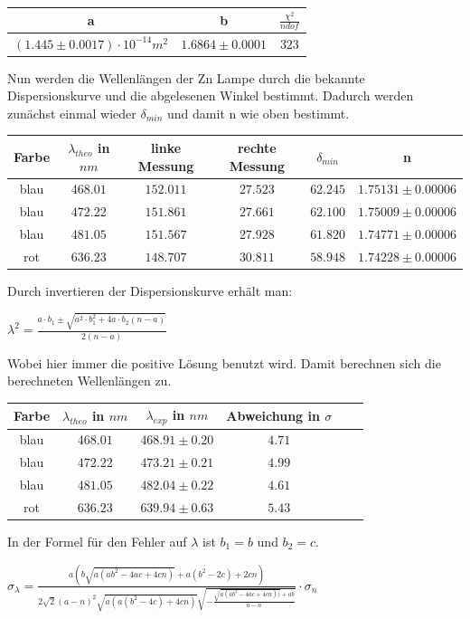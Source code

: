 \documentclass[a4paper, 11pt]{article}
\begin{document}
 \begin{center}
\begin{tabular}{|c|c|c|}
\hline a & b & $\frac{\chi^2}{ndof}$  \\
\hline  $(1.445 \pm 0.0017)\cdot 10^{-14}m^2 $&$1.6864 \pm 0.0001 $&$323 $\\
\hline
\end{tabular}
\end{center}

Nun werden die Wellenlängen der Zn Lampe durch die bekannte Dispersionskurve und die abgelesenen Winkel bestimmt.
Dadurch werden zunächst einmal wieder $\delta_{min}$ und damit n wie oben bestimmt.
\begin{center}
\begin{tabular}{|c|c|c|c|c|c|}
\hline Farbe & $\lambda_{theo}$ in $nm$ & linke Messung& rechte Messung& $\delta_{min}$ & n \\

\hline blau&$468.01$ &$152.011 $&$27.523 $&$62.245 $&$1.75131 \pm 0.00006$\\
\hline blau&$472.22$ &$151.861 $&$27.661 $&$62.100 $&$1.75009 \pm 0.00006$\\
\hline blau&$481.05$ &$151.567 $&$27.928 $&$61.820 $&$1.74771 \pm 0.00006$\\
\hline rot &$636.23$ &$148.707 $&$30.811 $&$58.948 $&$1.74228 \pm 0.00006$\\
\hline 
\end{tabular}
\end{center}



Durch invertieren der Dispersionskurve erhält man:
\begin{center}
$\lambda^2=\frac{a\cdot b_1 \pm \sqrt{a^2 \cdot b_1^2+4a\cdot b_2(n-a)}}{2(n-a)}$
\end{center}
Wobei hier immer die positive Lösung benutzt wird.
Damit berechnen sich die berechneten Wellenlängen zu.

\begin{center}
\begin{tabular}{|c|c|c|c|c|c|}
\hline Farbe & $\lambda_{theo}$ in $nm$ & $\lambda_{exp}$ in $nm$& Abweichung in $\sigma$\\

\hline blau&$468.01$ &$468.91 \pm 0.20 $&$4.71 $\\
\hline blau&$472.22$ &$473.21 \pm 0.21$&$4.99 $\\
\hline blau&$481.05$ &$482.04\pm 0.22 $&$4.61 $\\
\hline rot &$636.23$ &$639.94\pm 0.63 $&$5.43 $\\
\hline 
\end{tabular}
\end{center}
In der Formel für den Fehler auf $\lambda$ ist $b_1=b$ und $b_2=c$.
\begin{center}
$\sigma_{\lambda} = \frac{a (b \sqrt{a (a b^2 - 4 a c + 4 c n)} + a (b^2 - 2 c) + 2 c n)}{2 \sqrt{2} (a - n)^2 \sqrt{a (a (b^2 - 4 c) + 4 c n)} \sqrt{-\frac{\sqrt{ a (a b^2 - 4 a c + 4 c n))} + a b}{a - n}}}\cdot \sigma_n$
\end{center}
\end{document}
